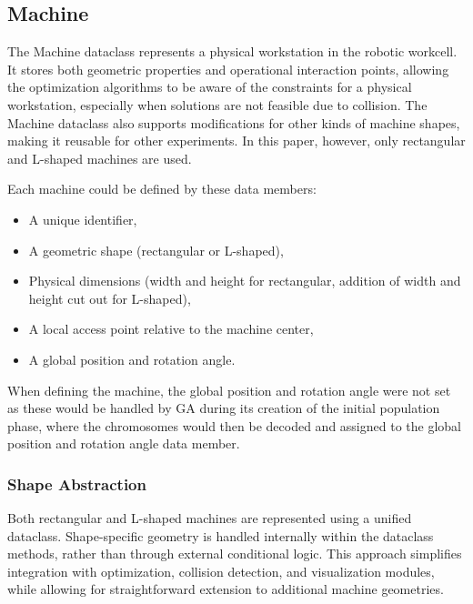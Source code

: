 \documentclass{article}
\begin{document}
\subsection{Machine}
The Machine dataclass represents a physical workstation in the robotic workcell. It stores both geometric properties and operational interaction points, allowing the optimization algorithms to be aware of the constraints for a physical workstation, especially when solutions are not feasible due to collision. The Machine dataclass also supports modifications for other kinds of machine shapes, making it reusable for other experiments. In this paper, however, only rectangular and L-shaped machines are used.

Each machine could be defined by these data members:
\begin{itemize}
    \item A unique identifier,
    \item A geometric shape (rectangular or L-shaped),
    \item Physical dimensions (width and height for rectangular, addition of width and height cut out for L-shaped),
    \item A local access point relative to the machine center,
    \item A global position and rotation angle.
\end{itemize}
When defining the machine, the global position and rotation angle were not set as these would be handled by GA during its creation of the initial population phase, where the chromosomes would then be decoded and assigned to the global position and rotation angle data member.

\subsubsection{Shape Abstraction}

Both rectangular and L-shaped machines are represented using a unified dataclass. Shape-specific geometry is handled internally within the dataclass methods, rather than through external conditional logic. This approach simplifies integration with optimization, collision detection, and visualization modules, while allowing for straightforward extension to additional machine geometries.
\end{document}
